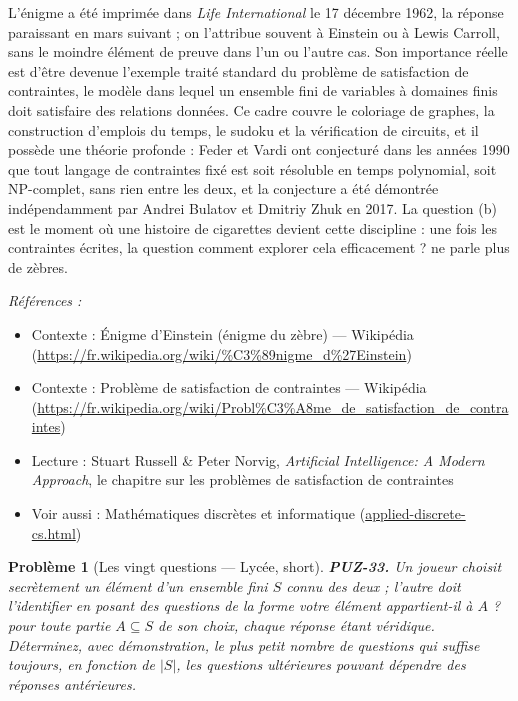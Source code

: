 \documentclass[11pt]{article}
\newtheorem{problem}{Problème}
\newenvironment{refs}{\par\small\noindent\emph{Références :}\begin{itemize}\setlength\itemsep{0pt}}{\end{itemize}\normalsize}
\begin{document}
\noindent L'énigme a été imprimée dans \textit{Life International} le 17 décembre
1962, la réponse paraissant en mars suivant ; on l'attribue souvent à Einstein ou à Lewis
Carroll, sans le moindre élément de preuve dans l'un ou l'autre cas. Son importance réelle
est d'être devenue l'exemple traité standard du problème de satisfaction de contraintes, le
modèle dans lequel un ensemble fini de variables à domaines finis doit satisfaire des
relations données. Ce cadre couvre le coloriage de graphes, la construction d'emplois du
temps, le sudoku et la vérification de circuits, et il possède une théorie profonde : Feder
et Vardi ont conjecturé dans les années 1990 que tout langage de contraintes fixé est soit
résoluble en temps polynomial, soit NP-complet, sans rien entre les deux, et la conjecture
a été démontrée indépendamment par Andrei Bulatov et Dmitriy Zhuk en 2017. La question (b)
est le moment où une histoire de cigarettes devient cette discipline : une fois les
contraintes écrites, la question \og{} comment explorer cela efficacement ? \fg{} ne parle plus de
zèbres.

\begin{refs}
\item Contexte : Énigme d'Einstein (énigme du zèbre) --- Wikipédia (\url{https://fr.wikipedia.org/wiki/%C3%89nigme_d%27Einstein})
\item Contexte : Problème de satisfaction de contraintes --- Wikipédia (\url{https://fr.wikipedia.org/wiki/Probl%C3%A8me_de_satisfaction_de_contraintes})
\item Lecture : Stuart Russell \& Peter Norvig, \textit{Artificial Intelligence: A Modern Approach}, le chapitre sur les problèmes de satisfaction de contraintes
\item Voir aussi : Mathématiques discrètes et informatique (\url{applied-discrete-cs.html})
\end{refs}

\bigskip

\begin{problem}[{Les vingt questions --- Lycée, short}]
\textbf{PUZ-33.} Un joueur choisit secrètement un élément d'un
ensemble fini $ S $ connu des deux ; l'autre doit l'identifier en posant des questions de
la forme \og{} votre élément appartient-il à $ A $ ? \fg{} pour toute partie
$ A \subseteq S $ de son choix, chaque réponse étant véridique. Déterminez, avec
démonstration, le plus petit nombre de questions qui suffise toujours, en fonction de
$ |S| $, les questions ultérieures pouvant dépendre des réponses antérieures.
\end{problem}
\end{document}
